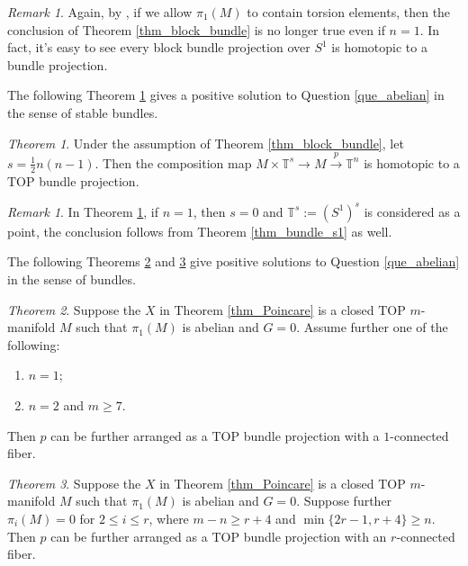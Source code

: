\documentclass[12pt]{amsart}
\theoremstyle{plain}
\theoremstyle{definition}
\theoremstyle{question}
\theoremstyle{remark}
\newtheorem{remark}[theorem]{Remark}
\theoremstyle{assumption}
\numberwithin{equation}{section}
\theoremstyle{bigthm}
\newtheorem{bigthm}{Theorem}
\begin{document}
\begin{remark}
Again, by \cite[Theorems~C~\&~D]{Qin_Su_Wang}, if we allow $\pi_{1} (M)$ to contain torsion elements, then the conclusion of Theorem \ref{thm_block_bundle} is no longer true even if $n=1$. In fact, it's easy to see every block bundle projection over $S^{1}$ is homotopic to a bundle projection.
\end{remark}

The following Theorem \ref{thm_stable_bundle} gives a positive solution to Question \ref{que_abelian} in the sense of stable bundles.
\begin{bigthm}\label{thm_stable_bundle}
Under the assumption of Theorem \ref{thm_block_bundle}, let $s = \frac{1}{2} n (n-1)$. Then the composition map $M \times \mathbb{T}^{s} \rightarrow M \overset{p}{\rightarrow} \mathbb{T}^{n}$ is homotopic to a $\mathrm{TOP}$ bundle projection.
\end{bigthm}

\begin{remark}
In Theorem \ref{thm_stable_bundle}, if $n=1$, then $s=0$ and $\mathbb{T}^{s} := (S^{1})^{s}$ is considered as a point, the conclusion follows from Theorem \ref{thm_bundle_s1} as well.
\end{remark}

The following Theorems \ref{thm_bundle_T2} and \ref{thm_bundle} give positive solutions to Question \ref{que_abelian} in the sense of bundles.
\begin{bigthm}\label{thm_bundle_T2}
Suppose the $X$ in Theorem \ref{thm_Poincare} is a closed $\mathrm{TOP}$ $m$-manifold $M$ such that $\pi_{1} (M)$ is abelian and $G=0$. Assume further one of the following:
\begin{enumerate}
\item $n=1$;

\item $n=2$ and $m \ge 7$.
\end{enumerate}
Then $p$ can be further arranged as a $\mathrm{TOP}$ bundle projection with a $1$-connected fiber.
\end{bigthm}

\begin{bigthm}\label{thm_bundle}
Suppose the $X$ in Theorem \ref{thm_Poincare} is a closed $\mathrm{TOP}$ $m$-manifold $M$ such that $\pi_{1} (M)$ is abelian and $G=0$. Suppose further $\pi_{i} (M) =0$ for $2 \le i \le r$, where $m-n \ge r+4$ and $\min \{ 2r-1, r+4 \} \ge n$. Then $p$ can be further arranged as a $\mathrm{TOP}$ bundle projection with an $r$-connected fiber.
\end{bigthm}
\end{document}
